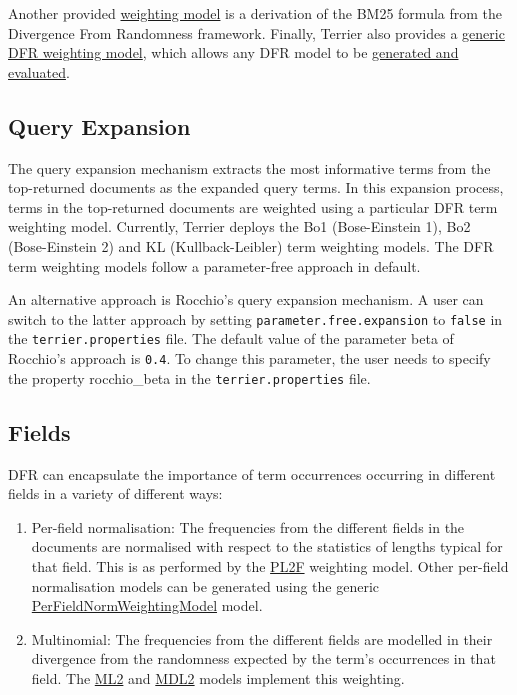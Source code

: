 Another provided
\href{javadoc/org/terrier/matching/models/DFR_BM25.html}{weighting
model} is a derivation of the BM25 formula from the Divergence From
Randomness framework. Finally, Terrier also provides a
\href{javadoc/org/terrier/matching/models/DFRWeightingModel.html}{generic
DFR weighting model}, which allows any DFR model to be
\href{extend_retrieval.html}{generated and evaluated}.

\href{}{}

\subsection{Query Expansion}\label{query-expansion}

The query expansion mechanism extracts the most informative terms from
the top-returned documents as the expanded query terms. In this
expansion process, terms in the top-returned documents are weighted
using a particular DFR term weighting model. Currently, Terrier deploys
the Bo1 (Bose-Einstein 1), Bo2 (Bose-Einstein 2) and KL
(Kullback-Leibler) term weighting models. The DFR term weighting models
follow a parameter-free approach in default.

An alternative approach is Rocchio's query expansion mechanism. A user
can switch to the latter approach by setting
\texttt{parameter.free.expansion} to \texttt{false} in the
\texttt{terrier.properties} file. The default value of the parameter
beta of Rocchio's approach is \texttt{0.4}. To change this parameter,
the user needs to specify the property rocchio\_beta in the
\texttt{terrier.properties} file.

\subsection{Fields}\label{fields}

DFR can encapsulate the importance of term occurrences occurring in
different fields in a variety of different ways:

\begin{enumerate}
\tightlist
\item
  Per-field normalisation: The frequencies from the different fields in
  the documents are normalised with respect to the statistics of lengths
  typical for that field. This is as performed by the
  \href{javadoc/org/terrier/matching/models/PL2F.html}{PL2F} weighting
  model. Other per-field normalisation models can be generated using the
  generic
  \href{javadoc/org/terrier/matching/models/PerFieldNormWeightingModel.html}{PerFieldNormWeightingModel}
  model.
\item
  Multinomial: The frequencies from the different fields are modelled in
  their divergence from the randomness expected by the term's
  occurrences in that field. The
  \href{javadoc/org/terrier/matching/models/ML2.html}{ML2} and
  \href{javadoc/org/terrier/matching/models/MDL2.html}{MDL2} models
  implement this weighting.
\end{enumerate}

